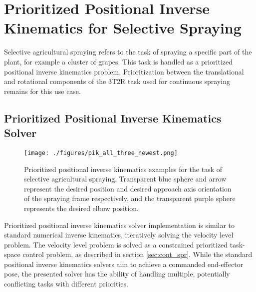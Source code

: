 \section{Prioritized Positional Inverse Kinematics for Selective Spraying}
Selective agricultural spraying refers to the task of spraying a specific part of the plant, for example a cluster of grapes. This task is handled as a prioritized positional inverse kinematics problem. Prioritization between the translational and rotational components of the 3T2R task used for continuous spraying remains for this use case. 

\subsection{Prioritized Positional Inverse Kinematics Solver}

\begin{figure*}[!ht]
\centering
\texttt{[image: ./figures/pik\_all\_three\_newest.png]}
\caption{Prioritized positional inverse kinematics examples for the task of selective agricultural spraying. Transparent blue sphere and arrow represent the desired position and desired approach axis orientation of the spraying frame respectively, and the transparent purple sphere represents the desired elbow position.}
\label{fig:pik_fig}
\end{figure*}

Prioritized positional inverse kinematics solver implementation is similar to standard numerical inverse kinematics, iteratively solving the velocity level problem. The velocity level problem is solved as a constrained prioritized task-space control problem, as described in section \ref{sec:cont_spr}. While the standard positional inverse kinematics solvers aim to achieve a commanded end-effector pose, the presented solver has the ability of handling multiple, potentially conflicting tasks with different priorities. 

